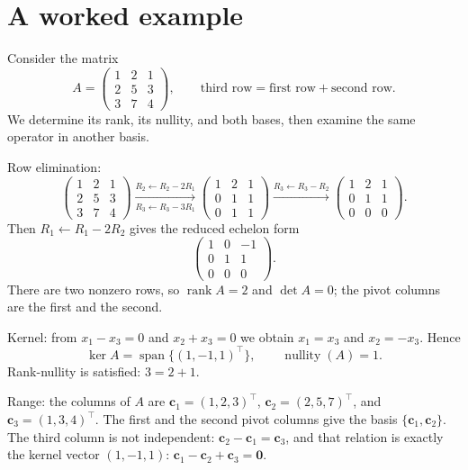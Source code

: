 \section{A worked example}

Consider the matrix
\[
  A=\begin{pmatrix}1&2&1\\ 2&5&3\\ 3&7&4\end{pmatrix},
  \qquad \text{third row}=\text{first row}+\text{second row}.
\]
We determine its rank, its nullity, and both bases, then examine the same operator in another
basis.

Row elimination:
\[
  \begin{pmatrix}1&2&1\\ 2&5&3\\ 3&7&4\end{pmatrix}
  \xrightarrow[R_{3}\leftarrow R_{3}-3R_{1}]{R_{2}\leftarrow R_{2}-2R_{1}}
  \begin{pmatrix}1&2&1\\ 0&1&1\\ 0&1&1\end{pmatrix}
  \xrightarrow{R_{3}\leftarrow R_{3}-R_{2}}
  \begin{pmatrix}1&2&1\\ 0&1&1\\ 0&0&0\end{pmatrix}.
\]
Then $R_{1}\leftarrow R_{1}-2R_{2}$ gives the reduced echelon form
\[
  \begin{pmatrix}1&0&-1\\ 0&1&1\\ 0&0&0\end{pmatrix}.
\]
There are two nonzero rows, so $\operatorname{rank}A=2$ and $\det A=0$; the pivot columns are the
first and the second.

Kernel: from $x_{1}-x_{3}=0$ and $x_{2}+x_{3}=0$ we obtain $x_{1}=x_{3}$ and
$x_{2}=-x_{3}$.
Hence
\[
  \ker A=\operatorname{span}\{(1,-1,1)^{\top}\},\qquad \operatorname{nullity}(A)=1 .
\]
Rank-nullity is satisfied: $3=2+1$.

Range: the columns of $A$ are $\mathbf{c}_{1}=(1,2,3)^{\top}$,
$\mathbf{c}_{2}=(2,5,7)^{\top}$, and $\mathbf{c}_{3}=(1,3,4)^{\top}$. The first and the
second
pivot columns give the basis $\{\mathbf{c}_{1},\mathbf{c}_{2}\}$. The third column is not independent:
$\mathbf{c}_{2}-\mathbf{c}_{1}=\mathbf{c}_{3}$, and that relation is exactly the kernel vector
$(1,-1,1)$: $\mathbf{c}_{1}-\mathbf{c}_{2}+\mathbf{c}_{3}=\mathbf{0}$.

